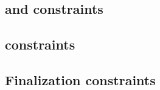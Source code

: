 \subsection{\ct{} and \maxCt{} constraints                                                            \lispTodo{}}  \label{rlp auth: generalities: ct and ct_max}                              
\subsection{\rlpAuthUtilsColumnSizeCountdown{} constraints                                            \lispTodo{}}  \label{rlp auth: generalities: byte size countdown constraints}            
\subsection{Finalization constraints                                                                  \lispTodo{}}  \label{rlp auth: generalities: finalization}                               
